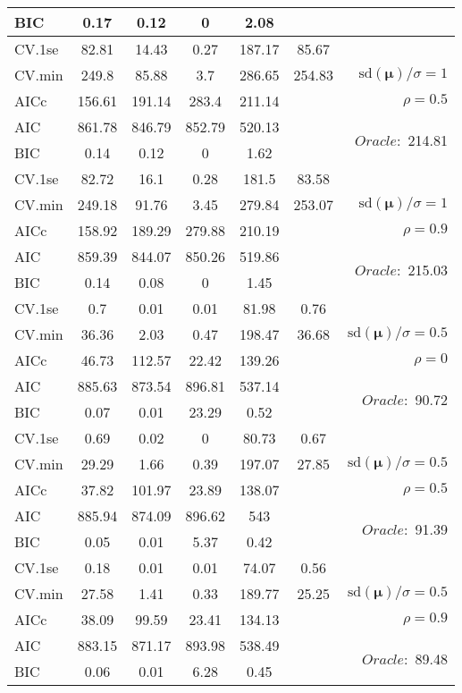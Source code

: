 \begin{table}
\begin{center}
\begin{tabular}{l*{5}{c}|r}
BIC & 0.17 & 0.12 & 0 & 2.08 & &  \\
 \hline 
CV.1se & 82.81 & 14.43 & 0.27 & 187.17 & 85.67 & \\
CV.min & 249.8 & 85.88 & 3.7 & 286.65 & 254.83 &  $\mathrm{sd}(\mathbf{\mu})/\sigma=1$ \\
AICc & 156.61 & 191.14 & 283.4 & 211.14 & & $\rho=0.5$ \\
AIC & 861.78 & 846.79 & 852.79 & 520.13 & &  \multirow{2}{*}{$Oracle: $ 214.81} \\
BIC & 0.14 & 0.12 & 0 & 1.62 & &  \\
 \hline 
CV.1se & 82.72 & 16.1 & 0.28 & 181.5 & 83.58 & \\
CV.min & 249.18 & 91.76 & 3.45 & 279.84 & 253.07 &  $\mathrm{sd}(\mathbf{\mu})/\sigma=1$ \\
AICc & 158.92 & 189.29 & 279.88 & 210.19 & & $\rho=0.9$ \\
AIC & 859.39 & 844.07 & 850.26 & 519.86 & &  \multirow{2}{*}{$Oracle: $ 215.03} \\
BIC & 0.14 & 0.08 & 0 & 1.45 & &  \\
 \hline 
CV.1se & 0.7 & 0.01 & 0.01 & 81.98 & 0.76 & \\
CV.min & 36.36 & 2.03 & 0.47 & 198.47 & 36.68 &  $\mathrm{sd}(\mathbf{\mu})/\sigma=0.5$ \\
AICc & 46.73 & 112.57 & 22.42 & 139.26 & & $\rho=0$ \\
AIC & 885.63 & 873.54 & 896.81 & 537.14 & &  \multirow{2}{*}{$Oracle: $ 90.72} \\
BIC & 0.07 & 0.01 & 23.29 & 0.52 & &  \\
 \hline 
CV.1se & 0.69 & 0.02 & 0 & 80.73 & 0.67 & \\
CV.min & 29.29 & 1.66 & 0.39 & 197.07 & 27.85 &  $\mathrm{sd}(\mathbf{\mu})/\sigma=0.5$ \\
AICc & 37.82 & 101.97 & 23.89 & 138.07 & & $\rho=0.5$ \\
AIC & 885.94 & 874.09 & 896.62 & 543 & &  \multirow{2}{*}{$Oracle: $ 91.39} \\
BIC & 0.05 & 0.01 & 5.37 & 0.42 & &  \\
 \hline 
CV.1se & 0.18 & 0.01 & 0.01 & 74.07 & 0.56 & \\
CV.min & 27.58 & 1.41 & 0.33 & 189.77 & 25.25 &  $\mathrm{sd}(\mathbf{\mu})/\sigma=0.5$ \\
AICc & 38.09 & 99.59 & 23.41 & 134.13 & & $\rho=0.9$ \\
AIC & 883.15 & 871.17 & 893.98 & 538.49 & &  \multirow{2}{*}{$Oracle: $ 89.48} \\
BIC & 0.06 & 0.01 & 6.28 & 0.45 & &  \\
 \hline 
\end{tabular}
\end{center}
\vspace{-1cm}
\end{table}




